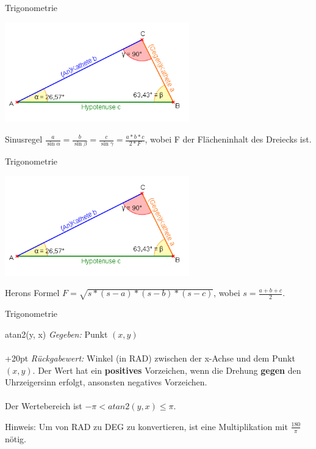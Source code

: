 \begin{frame}{Trigonometrie}
	\begin{center}
		\includegraphics[width=0.6\textwidth,height=.8\textheight,keepaspectratio]{dreieck.png}
	\end{center}
	
	\begin{block}{Sinusregel}
		$\frac{a}{\sin \alpha} = \frac{b}{\sin \beta} = \frac{c}{\sin \gamma} = \frac{a * b * c}{2 * F}$,
		wobei F der Flächeninhalt des Dreiecks ist.
	\end{block}
\end{frame}

\begin{frame}{Trigonometrie}
	\begin{center}
		\includegraphics[width=0.6\textwidth,height=.8\textheight,keepaspectratio]{dreieck.png}
	\end{center}
	
	\begin{block}{Herons Formel}
		$F = \sqrt{s * (s - a) * (s - b) * (s - c)}$, wobei $s = \frac{a + b + c}{2}$.
	\end{block}
\end{frame}

\begin{frame}{Trigonometrie}
	\begin{block}{atan2(y, x)}
		\textit{Gegeben:} Punkt $(x,y)$\\ \ \\
		
		\hangindent+20pt 
		\textit{Rückgabewert:} Winkel (in RAD) zwischen der x-Achse und dem Punkt $(x,y)$. Der Wert hat ein \textbf{positives} Vorzeichen, wenn die Drehung \textbf{gegen} den Uhrzeigersinn erfolgt, ansonsten negatives Vorzeichen.\\ \ \\

		Der Wertebereich ist $-\pi < atan2(y, x) \leq \pi$.
	\end{block}
	
	Hinweis: Um von RAD zu DEG zu konvertieren, ist eine Multiplikation mit $\frac{180}{\pi}$ nötig.
\end{frame}

